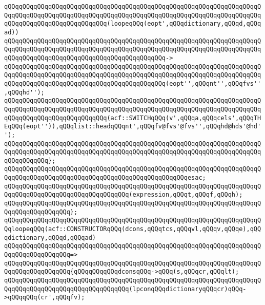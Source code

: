 \verb|qQQqqQQqqQQqqQQqqQQqqQQqqQQqqQQqqQQqqQQqqQQqqQQqqQQqqQQqqQQqqQQqqQQqqQQqqQQqqQQqqQQqqQQqqQQqqQQqqQQqqQQqqQQqqQQqqQQqqQQqqQQqqQQqqQQqqQQqqQQqqQQqqQQqqQQqqQQqqQQqqQQqqQQq(loopeqQQq(eopt',qQQqdictionary,qQQqd,qQQqad))|\newline
\verb|qQQqqQQqqQQqqQQqqQQqqQQqqQQqqQQqqQQqqQQqqQQqqQQqqQQqqQQqqQQqqQQqqQQqqQQqqQQqqQQqqQQqqQQqqQQqqQQqqQQqqQQqqQQqqQQqqQQqqQQqqQQqqQQqqQQqqQQqqQQqqQQqqQQqqQQqqQQqqQQqqQQqqQQqqQQqqQQqqQQqqQQq->|\newline
\verb|qQQqqQQqqQQqqQQqqQQqqQQqqQQqqQQqqQQqqQQqqQQqqQQqqQQqqQQqqQQqqQQqqQQqqQQqqQQqqQQqqQQqqQQqqQQqqQQqqQQqqQQqqQQqqQQqqQQqqQQqqQQqqQQqqQQqqQQqqQQqqQQqqQQqqQQqqQQqqQQqqQQqqQQqqQQqqQQqqQQqqQQq(eopt'',qQQqnt'',qQQqfvs'',qQQqhd'');|\newline
\newline
\verb|qQQqqQQqqQQqqQQqqQQqqQQqqQQqqQQqqQQqqQQqqQQqqQQqqQQqqQQqqQQqqQQqqQQqqQQqqQQqqQQqqQQqqQQqqQQqqQQqqQQqqQQqqQQqqQQqqQQqqQQqqQQqqQQqqQQqqQQqqQQqqQQqqQQqqQQqqQQqqQQqqQQqqQQq(acf::SWITCHqQQq(v',qQQqa,qQQqcels',qQQqTHEqQQq(eopt'')),qQQqlist::headqQQqnt',qQQqfv@fvs'@fvs'',qQQqhd@hds'@hd'');|\newline
\verb|qQQqqQQqqQQqqQQqqQQqqQQqqQQqqQQqqQQqqQQqqQQqqQQqqQQqqQQqqQQqqQQqqQQqqQQqqQQqqQQqqQQqqQQqqQQqqQQqqQQqqQQqqQQqqQQqqQQqqQQqqQQqqQQqqQQqqQQqqQQqqQQqqQQqqQQq};|\newline
\verb|qQQqqQQqqQQqqQQqqQQqqQQqqQQqqQQqqQQqqQQqqQQqqQQqqQQqqQQqqQQqqQQqqQQqqQQqqQQqqQQqqQQqqQQqqQQqqQQqqQQqqQQqqQQqqQQqqQQqqQQqesac;|\newline
\newline
\verb|qQQqqQQqqQQqqQQqqQQqqQQqqQQqqQQqqQQqqQQqqQQqqQQqqQQqqQQqqQQqqQQqqQQqqQQqqQQqqQQqqQQqqQQqqQQqqQQqqQQqqQQq(expression,qQQqt,qQQqf,qQQqh);|\newline
\verb|qQQqqQQqqQQqqQQqqQQqqQQqqQQqqQQqqQQqqQQqqQQqqQQqqQQqqQQqqQQqqQQqqQQqqQQqqQQqqQQqqQQqqQQq};|\newline
\newline
\verb|qQQqqQQqqQQqqQQqqQQqqQQqqQQqqQQqqQQqqQQqqQQqqQQqqQQqqQQqqQQqqQQqqQQqqQQqloopeqQQq(acf::CONSTRUCTORqQQq(dcons,qQQqtcs,qQQqvl,qQQqv,qQQqe),qQQqdictionary,qQQqd,qQQqad)|\newline
\verb|qQQqqQQqqQQqqQQqqQQqqQQqqQQqqQQqqQQqqQQqqQQqqQQqqQQqqQQqqQQqqQQqqQQqqQQqqQQqqQQqqQQqqQQq=>|\newline
\verb|qQQqqQQqqQQqqQQqqQQqqQQqqQQqqQQqqQQqqQQqqQQqqQQqqQQqqQQqqQQqqQQqqQQqqQQqqQQqqQQqqQQqqQQq{qQQqqQQqqQQqdconsqQQq->qQQq(s,qQQqcr,qQQqlt);|\newline
\verb|qQQqqQQqqQQqqQQqqQQqqQQqqQQqqQQqqQQqqQQqqQQqqQQqqQQqqQQqqQQqqQQqqQQqqQQqqQQqqQQqqQQqqQQqqQQqqQQqqQQqqQQq(lpconqQQqdictionaryqQQqcr)qQQq->qQQqqQQq(cr',qQQqfv);|\newline
